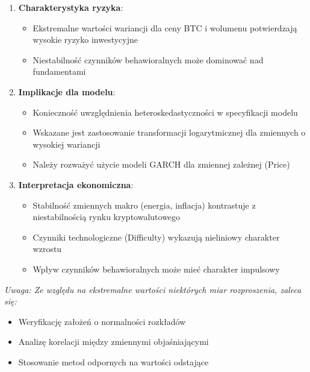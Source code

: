 \documentclass[
  11pt,
]{article}
\providecommand{\tightlist}{%
  \setlength{\itemsep}{0pt}\setlength{\parskip}{0pt}}
\begin{document}
\begin{enumerate}
\def\labelenumi{\arabic{enumi}.}
\tightlist
\item
  \textbf{Charakterystyka ryzyka}: \vspace{0.2cm}

  \begin{itemize}
  \tightlist
  \item
    Ekstremalne wartości wariancji dla ceny BTC i wolumenu potwierdzają
    wysokie ryzyko inwestycyjne
  \item
    Niestabilność czynników behawioralnych może dominować nad
    fundamentami
  \end{itemize}
\item
  \textbf{Implikacje dla modelu}: \vspace{0.2cm}

  \begin{itemize}
  \tightlist
  \item
    Konieczność uwzględnienia heteroskedastyczności w specyfikacji
    modelu
  \item
    Wskazane jest zastosowanie transformacji logarytmicznej dla
    zmiennych o wysokiej wariancji
  \item
    Należy rozważyć użycie modeli GARCH dla zmiennej zależnej (Price)
  \end{itemize}
\item
  \textbf{Interpretacja ekonomiczna}: \vspace{0.2cm}

  \begin{itemize}
  \tightlist
  \item
    Stabilność zmiennych makro (energia, inflacja) kontrastuje z
    niestabilnością rynku kryptowalutowego
  \item
    Czynniki technologiczne (Difficulty) wykazują nieliniowy charakter
    wzrostu
  \item
    Wpływ czynników behawioralnych może mieć charakter impulsowy
  \end{itemize}
\end{enumerate}

\vspace{0.3cm}

\textit{Uwaga: Ze względu na ekstremalne wartości niektórych miar rozproszenia, zaleca się:}

\begin{itemize}
\item Weryfikację założeń o normalności rozkładów
\item Analizę korelacji między zmiennymi objaśniającymi
\item Stosowanie metod odpornych na wartości odstające
\end{itemize}
\end{document}
